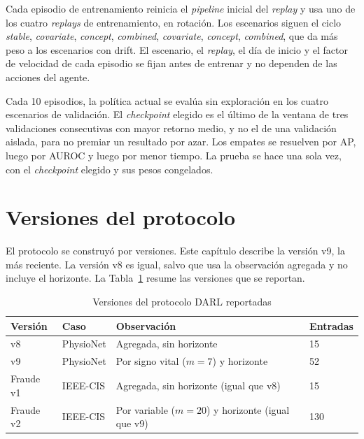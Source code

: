 Cada episodio de entrenamiento reinicia el \textit{pipeline} inicial del \textit{replay} y usa
uno de los cuatro \textit{replays} de entrenamiento, en rotación. Los escenarios siguen el ciclo
\textit{stable}, \textit{covariate}, \textit{concept}, \textit{combined}, \textit{covariate},
\textit{concept}, \textit{combined}, que da más peso a los escenarios con drift. El escenario,
el \textit{replay}, el día de inicio y el factor de velocidad de cada episodio se fijan antes de
entrenar y no dependen de las acciones del agente.

Cada 10 episodios, la política actual se evalúa sin exploración en los cuatro escenarios de
validación. El \textit{checkpoint} elegido es el último de la ventana de tres validaciones
consecutivas con mayor retorno medio, y no el de una validación aislada, para no premiar un
resultado por azar. Los empates se resuelven por AP, luego por AUROC y luego por menor tiempo.
La prueba se hace una sola vez, con el \textit{checkpoint} elegido y sus pesos congelados.

\section{Versiones del protocolo}
\label{sec:met_versiones}

El protocolo se construyó por versiones. Este capítulo describe la versión v9, la más reciente.
La versión v8 es igual, salvo que usa la observación agregada y no incluye el horizonte. La
Tabla~\ref{tab:versiones_protocolo} resume las versiones que se reportan.

\begin{table}[H]
    \centering
    \caption{Versiones del protocolo DARL reportadas}
    \label{tab:versiones_protocolo}
    \small
    \begin{tabular}{p{2.2cm}p{2.2cm}p{5.4cm}p{1.8cm}}
        \hline
        \textbf{Versión} & \textbf{Caso} & \textbf{Observación} & \textbf{Entradas} \\
        \hline
        v8          & PhysioNet & Agregada, sin horizonte                          & 15 \\
        v9          & PhysioNet & Por signo vital ($m = 7$) y horizonte            & 52 \\
        Fraude v1   & IEEE-CIS  & Agregada, sin horizonte (igual que v8)           & 15 \\
        Fraude v2   & IEEE-CIS  & Por variable ($m = 20$) y horizonte (igual que v9) & 130 \\
        \hline
    \end{tabular}
\end{table}

